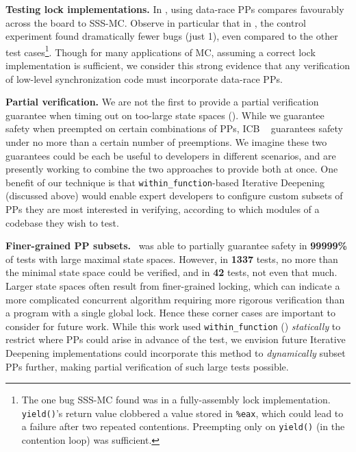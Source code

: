 {\bf Testing lock implementations.}
In \sect{\ref{sec:eval-drbugs}}, using data-race PPs compares favourably across the board to SSS-MC.
Observe in particular that in \mxtest, the control experiment found dramatically fewer bugs (just 1),
even compared to the other test cases\footnote{
	The one bug SSS-MC found was in a fully-assembly lock implementation. {\tt yield()}'s return value clobbered a value stored in {\tt \%eax}, which could lead to a failure after two repeated contentions. Preempting only on {\tt yield()} (in the contention loop) was sufficient.}.
Though for many applications of MC, assuming a correct lock implementation is sufficient,
we consider this strong evidence that any verification of low-level synchronization code must incorporate data-race PPs.

{\bf Partial verification.}
We are not the first to provide a partial verification guarantee when timing out on too-large state spaces (\sect{\ref{sec:eval-id}}).
While we guarantee safety when preempted on certain combinations of PPs,
ICB ~\cite{chess} guarantees safety under no more than a certain number of preemptions.
We imagine these two guarantees could be each be useful to developers in different scenarios,
and are presently working to combine the two approaches to provide both at once.
One benefit of our technique is that {\tt within\_function}-based Iterative Deepening (discussed above)
would enable expert developers to configure custom subsets of PPs they are most interested in verifying,
according to which modules of a codebase they wish to test.

{\bf Finer-grained PP subsets.}
\quicksand~was able to partially guarantee safety in {\large \bf 99999\%} of tests with large maximal state spaces.
However, in {\large \bf 1337} tests, no more than the minimal state space could be verified,
and in {\large \bf 42} tests, not even that much.
Larger state spaces often result from finer-grained locking,
which can indicate a more complicated concurrent algorithm requiring more rigorous verification than a program with a single global lock.
Hence these corner cases are important to consider for future work.
While this work used {\tt within\_function} (\sect{\ref{sec:landslide}}) {\em statically} to restrict where PPs could arise in advance of the test,
we envision future Iterative Deepening implementations could incorporate this method to {\em dynamically} subset PPs further,
making partial verification of such large tests possible.

